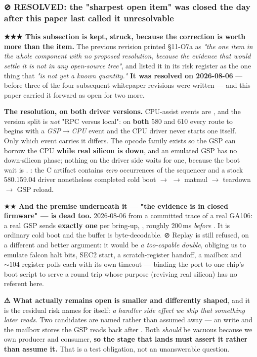 \documentclass[10.5pt]{article}
\begin{document}
\subsubsection*{\texorpdfstring{⊘ RESOLVED: the "sharpest open item" was closed the day after this paper last called it unresolvable}{RESOLVED: the sharpest open item was closed}}

\begin{warnbox}\small
\textbf{★★★ This subsection is kept, struck, because the correction is worth more than the item.}
The previous revision printed \S11-O7a as \emph{"the one item in the whole component with no
proposed resolution, because the evidence that would settle it is not in any open-source tree"},
and listed it in its risk register as the one thing that \emph{"is not yet a known quantity."}
\textbf{It was resolved on 2026-08-06} — before three of the four subsequent whitepaper
revisions were written — and this paper carried it forward as open for two more.

\smallskip
\textbf{The resolution, on both driver versions.} CPU-assist events are , and the
version split is \emph{not} "RPC versus local": on \textbf{both} 580 and 610 every route to
 begins with a \emph{GSP$\to$CPU} event and the CPU driver never starts one
itself. Only which event carries it differs. The opcode family exists so the GSP can borrow the
CPU \textbf{while real silicon is down}, and an emulated GSP has no down-silicon phase; nothing on
the driver side waits for one, because the boot wait is .
\measured{}: the C artifact contains \emph{zero} occurrences of the sequencer and a stock
580.159.04 driver nonetheless completed cold boot $\to$  $\to$ matmul $\to$
teardown $\to$ GSP reload.

\smallskip
★★ \textbf{And the premise underneath it — "the evidence is in closed firmware" — is dead too.}
\measured{} 2026-08-06 from a committed trace of a real GA106: a real GSP sends \textbf{exactly
one}  per bring-up, , roughly 200\,ms
\emph{before} . It is ordinary cold boot and the buffer is byte-decodable.
⊘ Replay is still refused, on a different and better argument: it would be \emph{a too-capable
double}, obliging us to emulate falcon halt bits, SEC2 start, a scratch-register handoff, a
mailbox and ${\sim}104$ register polls each with its own timeout — binding the port to one chip's
boot script to serve a round trip whose purpose (reviving real silicon) has no referent here.

\smallskip
\textbf{⚠ What actually remains open is smaller and differently shaped}, and it is the residual
risk  names for itself: \emph{a handler side effect we skip that something later
reads}. Two candidates are named rather than assumed away — an  write and the
mailbox stores the GSP reads back after . Both \emph{should} be vacuous because
we own producer and consumer, \textbf{so the stage that lands must assert it rather than assume
it.} That is a test obligation, not an unanswerable question.
\end{warnbox}
\end{document}
